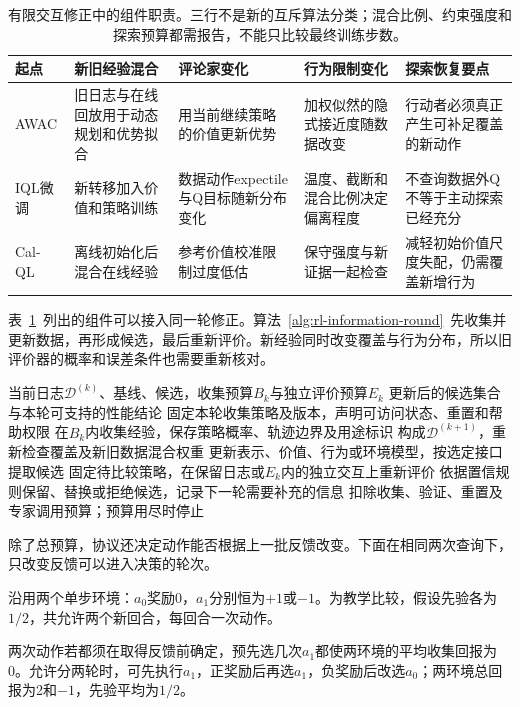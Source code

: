 \begin{table}[t]
  \centering
  \small
  \begin{tabularx}{\linewidth}{p{18mm}XXXX}
    \toprule
    起点 & 新旧经验混合 & 评论家变化 & 行为限制变化 & 探索恢复要点 \\
    \midrule
    AWAC & 旧日志与在线回放用于动态规划和优势拟合 & 用当前继续策略的价值更新优势 & 加权似然的隐式接近度随数据改变 & 行动者必须真正产生可补足覆盖的新动作 \\
    IQL微调 & 新转移加入价值和策略训练 & 数据动作expectile与Q目标随新分布变化 & 温度、截断和混合比例决定偏离程度 & 不查询数据外Q不等于主动探索已经充分 \\
    Cal-QL & 离线初始化后混合在线经验 & 参考价值校准限制过度低估 & 保守强度与新证据一起检查 & 减轻初始价值尺度失配，仍需覆盖新增行为 \\
    \bottomrule
  \end{tabularx}
  \caption{有限交互修正中的组件职责。三行不是新的互斥算法分类；混合比例、约束强度和探索预算都需报告，不能只比较最终训练步数。}
  \label{tab:rl-information-finetuning}
\end{table}

表~\ref{tab:rl-information-finetuning}~列出的组件可以接入同一轮修正。算法~\ref{alg:rl-information-round}~先收集并更新数据，再形成候选，最后重新评价。新经验同时改变覆盖与行为分布，所以旧评价器的概率和误差条件也需要重新核对。

\begin{algorithm}[一轮有限经验修正]
  \label{alg:rl-information-round}
  \begin{algorithmic}[1]
    \Require 当前日志$\mathcal D^{(k)}$、基线、候选，收集预算$B_k$与独立评价预算$E_k$
    \Ensure 更新后的候选集合与本轮可支持的性能结论
    \State 固定本轮收集策略及版本，声明可访问状态、重置和帮助权限
    \State 在$B_k$内收集经验，保存策略概率、轨迹边界及用途标识
    \State 构成$\mathcal D^{(k+1)}$，重新检查覆盖及新旧数据混合权重
    \State 更新表示、价值、行为或环境模型，按选定接口提取候选
    \State 固定待比较策略，在保留日志或$E_k$内的独立交互上重新评价
    \State 依据置信规则保留、替换或拒绝候选，记录下一轮需要补充的信息
    \State 扣除收集、验证、重置及专家调用预算；预算用尽时停止
  \end{algorithmic}
\end{algorithm}

除了总预算，协议还决定动作能否根据上一批反馈改变。下面在相同两次查询下，只改变反馈可以进入决策的轮次。

\begin{example}[相同两次查询与不同适应轮次]
  \label{ex:rl-information-batches}
  沿用两个单步环境：$a_0$奖励0，$a_1$分别恒为$+1$或$-1$。为教学比较，假设先验各为$1/2$，共允许两个新回合，每回合一次动作。

  两次动作若都须在取得反馈前确定，预先选几次$a_1$都使两环境的平均收集回报为0。允许分两轮时，可先执行$a_1$，正奖励后再选$a_1$，负奖励后改选$a_0$；两环境总回报为2和$-1$，先验平均为$1/2$。
\end{example}

